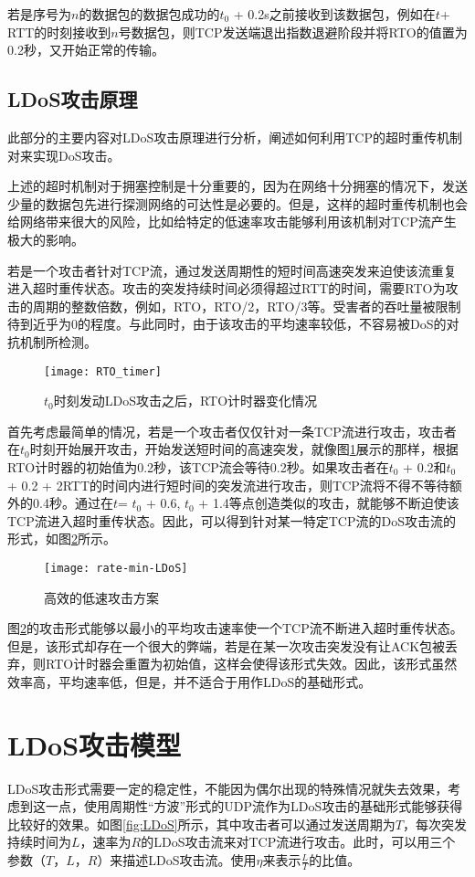 若是序号为$n$的数据包的数据包成功的$t_0$ + 0.2s之前接收到该数据包，例如在$t$+ RTT的时刻接收到$n$号数据包，则TCP发送端退出指数退避阶段并将RTO的值置为0.2秒，又开始正常的传输。

\subsection{LDoS攻击原理}
此部分的主要内容对LDoS攻击原理进行分析，阐述如何利用TCP的超时重传机制对来实现DoS攻击。

上述的超时机制对于拥塞控制是十分重要的，因为在网络十分拥塞的情况下，发送少量的数据包先进行探测网络的可达性是必要的。但是，这样的超时重传机制也会给网络带来很大的风险，比如给特定的低速率攻击能够利用该机制对TCP流产生极大的影响。

若是一个攻击者针对TCP流，通过发送周期性的短时间高速突发来迫使该流重复进入超时重传状态。攻击的突发持续时间必须得超过RTT的时间，需要RTO为攻击的周期的整数倍数，例如，RTO，RTO/2，RTO/3等。受害者的吞吐量被限制待到近乎为0的程度。与此同时，由于该攻击的平均速率较低，不容易被DoS的对抗机制所检测。

\begin{figure}
    \centering
    \texttt{[image: RTO\_timer]}
    \caption{$t_0$时刻发动LDoS攻击之后，RTO计时器变化情况}
    \label{fig:rto-timer}
\end{figure}

首先考虑最简单的情况，若是一个攻击者仅仅针对一条TCP流进行攻击，攻击者在$t_0$时刻开始展开攻击，开始发送短时间的高速突发，就像图\ref{fig:rto-timer}展示的那样，根据RTO计时器的初始值为0.2秒，该TCP流会等待0.2秒。如果攻击者在$t_0$ + 0.2和$t_0$ + 0.2 + 2RTT的时间内进行短时间的突发流进行攻击，则TCP流将不得不等待额外的0.4秒。通过在$t$= $t_0$ + 0.6, $t_0$ + 1.4等点创造类似的攻击，就能够不断迫使该TCP流进入超时重传状态。因此，可以得到针对某一特定TCP流的DoS攻击流的形式，如图\ref{fig:rate-min-LDoS}所示。

\begin{figure}
    \centering
    \texttt{[image: rate-min-LDoS]}
    \caption{高效的低速攻击方案}
    \label{fig:rate-min-LDoS}
\end{figure}

图\ref{fig:rate-min-LDoS}的攻击形式能够以最小的平均攻击速率使一个TCP流不断进入超时重传状态。但是，该形式却存在一个很大的弊端，若是在某一次攻击突发没有让ACK包被丢弃，则RTO计时器会重置为初始值，这样会使得该形式失效。因此，该形式虽然效率高，平均速率低，但是，并不适合于用作LDoS的基础形式。


\section{LDoS攻击模型}
\label{chap3:LDoS-model}
LDoS攻击形式需要一定的稳定性，不能因为偶尔出现的特殊情况就失去效果，考虑到这一点，使用周期性“方波”形式的UDP流作为LDoS攻击的基础形式能够获得比较好的效果。如图\ref{fig:LDoS}所示，其中攻击者可以通过发送周期为$T$，每次突发持续时间为$L$，速率为$R$的LDoS攻击流来对TCP流进行攻击。此时，可以用三个参数（$T$，$L$，$R$）来描述LDoS攻击流。使用$\eta$来表示$\frac{L}{T}$的比值。

